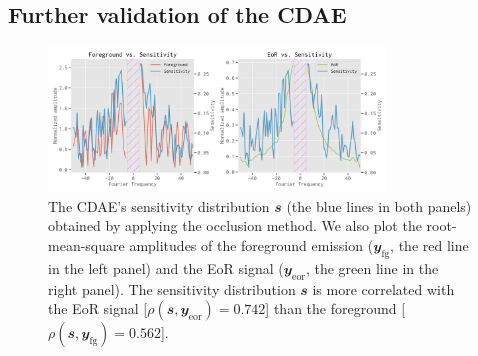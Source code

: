 \documentclass[fleqn,usenatbib]{mnras}
\newcommand{\R}[1]{\mathrm{#1}}
\newcommand{\B}[1]{\mathbfit{#1}}
\newcommand{\editone}[1]{{\leavevmode\color{cyan}#1}}
\begin{document}
\editone{%
\subsection{Further validation of the CDAE}
\label{sec:validation}

\begin{figure}
  \centering
  \includegraphics[width=0.8\textwidth]{occlusion-fgeor}
  \caption{\label{fig:occ-fgeor}\editone{%
    The CDAE's sensitivity distribution $\B{s}$ (the blue lines in both
    panels) obtained by applying the occlusion method.
    We also plot the root-mean-square amplitudes of the foreground emission
    ($\B{y}_{\R{fg}}$, the red line in the left panel) and the EoR signal
    ($\B{y}_{\R{eor}}$, the green line in the right panel).
    The sensitivity distribution $\B{s}$ is more correlated with the EoR
    signal [$\rho(\B{s}, \B{y}_{\R{eor}}) = 0.742$] than the foreground
    [$\rho(\B{s}, \B{y}_{\R{fg}}) = 0.562$].
  }}
\end{figure}

}
\end{document}

